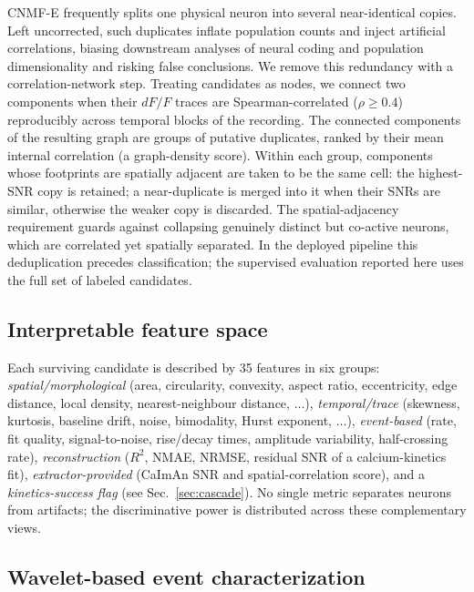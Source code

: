 \documentclass[conference]{IEEEtran}
\begin{document}
CNMF-E frequently splits one physical neuron into several near-identical copies. Left uncorrected, such duplicates inflate population counts and inject artificial correlations, biasing downstream analyses of neural coding and population dimensionality and risking false conclusions. We remove this redundancy with a correlation-network step. Treating candidates as nodes, we connect two components when their $dF/F$ traces are Spearman-correlated ($\rho\ge0.4$) reproducibly across temporal blocks of the recording. The connected components of the resulting graph are groups of putative duplicates, ranked by their mean internal correlation (a graph-density score). Within each group, components whose footprints are spatially adjacent are taken to be the same cell: the highest-SNR copy is retained; a near-duplicate is merged into it when their SNRs are similar, otherwise the weaker copy is discarded. The spatial-adjacency requirement guards against collapsing genuinely distinct but co-active neurons, which are correlated yet spatially separated. In the deployed pipeline this deduplication precedes classification; the supervised evaluation reported here uses the full set of labeled candidates.

\subsection{Interpretable feature space}

Each surviving candidate is described by 35 features in six groups: \emph{spatial/morphological} (area, circularity, convexity, aspect ratio, eccentricity, edge distance, local density, nearest-neighbour distance, $\dots$), \emph{temporal/trace} (skewness, kurtosis, baseline drift, noise, bimodality, Hurst exponent, $\dots$), \emph{event-based} (rate, fit quality, signal-to-noise, rise/decay times, amplitude variability, half-crossing rate), \emph{reconstruction} ($R^2$, NMAE, NRMSE, residual SNR of a calcium-kinetics fit), \emph{extractor-provided} (CaImAn SNR and spatial-correlation score), and a \emph{kinetics-success flag} (see Sec.~\ref{sec:cascade}). No single metric separates neurons from artifacts; the discriminative power is distributed across these complementary views.

\subsection{Wavelet-based event characterization}
\label{sec:wavelet}
\end{document}
